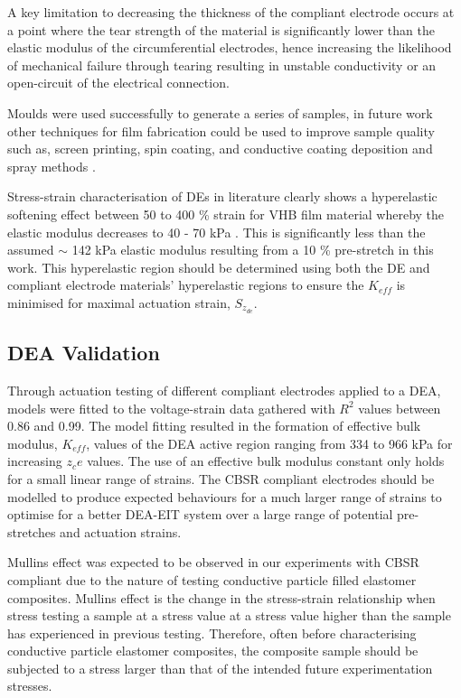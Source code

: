A key limitation to decreasing the thickness of the compliant electrode occurs at a point where the tear strength of the material is significantly lower than the elastic modulus of the circumferential electrodes, hence increasing the likelihood of mechanical failure through tearing resulting in unstable conductivity or an open-circuit of the electrical connection.

Moulds were used successfully to generate a series of samples, in future work other techniques for film fabrication could be used to improve sample quality such as, screen printing, spin coating, and conductive coating deposition and spray methods \cite{Carpi2015, Weiss2016, Mavukkandy2020} .

Stress-strain characterisation of DEs in literature clearly shows a hyperelastic softening effect between 50 to 400 \% strain for VHB film material whereby the elastic modulus decreases to 40 - 70 kPa\cite{Liu2018} . This is significantly less than the assumed $\sim$ 142 kPa elastic modulus resulting from a 10 \% pre-stretch in this work. This hyperelastic region should be determined using both the DE and compliant electrode materials' hyperelastic regions to ensure the $K_{e\!f\!f}$ is minimised for maximal actuation strain, $S_{z_{de}}$. 


\subsection{DEA Validation}
\label{subsec:dea_validation3}
Through actuation testing of different compliant electrodes applied to a DEA, models were fitted to the voltage-strain data gathered with $R^2$ values between 0.86 and 0.99. The model fitting resulted in the formation of effective bulk modulus, $K_{e\!f\!f}$, values of the DEA active region ranging from 334 to 966 kPa for increasing $z_ce$ values. The use of an effective bulk modulus constant only holds for a small linear range of strains. The CBSR compliant electrodes should be modelled to produce expected behaviours for a much larger range of strains to optimise for a better DEA-EIT system over a large range of potential pre-stretches and actuation strains.

Mullins effect was expected to be observed in our experiments with CBSR compliant due to the nature of testing conductive particle filled elastomer composites\cite{Diani2009}. Mullins effect is the change in the stress-strain relationship when stress testing a sample at a stress value at a stress value higher than the sample has experienced in previous testing. Therefore, often before characterising conductive particle elastomer composites, the composite sample should be subjected to a stress larger than that of the intended future experimentation stresses. 

